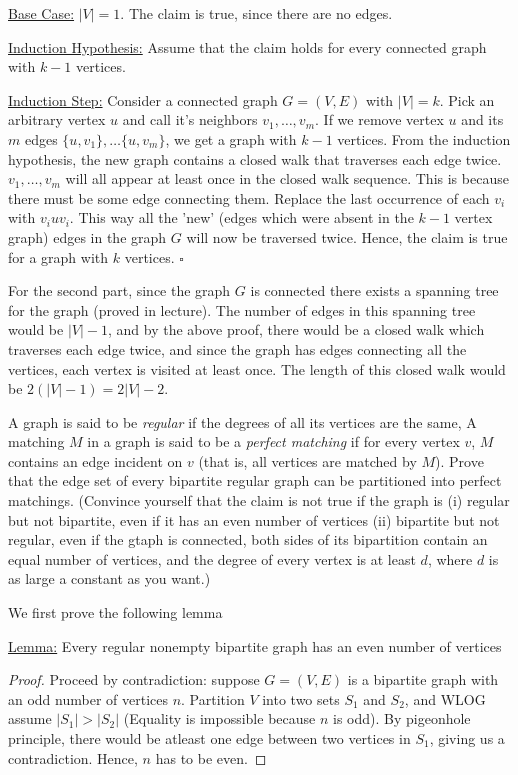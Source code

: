 \documentclass[12pt,answers]{exam}
\begin{document}
\begin{questions}
\begin{solution}
\underline{Base Case:} $|V| = 1$. The claim is true, since there are no edges.

\underline{Induction Hypothesis:} Assume that the claim holds for every connected graph with $k-1$ vertices.

\underline{Induction Step:} Consider a connected graph $G = (V,E)$ with $|V|=k$. Pick an arbitrary vertex $u$ and call it's neighbors $v_1,\ldots,v_m$. If we remove vertex $u$ and its $m$ edges $\{u,v_1 \},\ldots \{u,v_m \}$, we get a graph with $k-1$ vertices. From the induction hypothesis, the new graph contains a closed walk that traverses each edge twice. $v_1,\ldots,v_m$ will all appear at least once in the closed walk sequence. This is because there must be some edge connecting them. Replace the last occurrence of each $v_i$ with $v_i u v_i$. This way all the 'new' (edges which were absent in the $k-1$ vertex graph) edges in the graph $G$ will now be traversed twice. Hence, the claim is true for a graph with $k$ vertices. \hfill $\square$

For the second part, since the graph $G$ is connected there exists a spanning tree for the graph (proved in lecture). The number of edges in this spanning tree would be $|V|-1$, and by the above proof, there would be a closed walk which traverses each edge twice, and since the graph has edges connecting all the vertices, each vertex is visited at least once. The length of this closed walk would be $2(|V|-1) = 2|V|-2$. 
\end{solution}


\question A graph is said to be \textit{regular} if the degrees of all its vertices are the same, A matching $M$ in a graph is said to be a \textit{perfect matching} if for every vertex $v$, $M$ contains an edge incident on $v$ (that is, all vertices are matched by $M$). Prove that the edge set of every bipartite regular graph can be partitioned into perfect matchings. (Convince yourself that the claim is not true if the graph is (i) regular but not bipartite, even if it has an even number of vertices (ii) bipartite but not regular, even if the gtaph is connected, both sides of its bipartition contain an equal number of vertices, and the degree of every vertex is at least $d$, where $d$ is as large a constant as you want.)
\begin{solution} We first prove the following lemma

\underline{Lemma:} Every regular nonempty bipartite graph has an even number of vertices

\begin{proof}
Proceed by contradiction: suppose $G = (V,E)$ is a bipartite graph with an odd number of vertices $n$. Partition $V$ into two sets $S_1$ and $S_2$, and WLOG assume $|S_1| > |S_2|$ (Equality is impossible because $n$ is odd). By pigeonhole principle, there would be atleast one edge between two vertices in $S_1$, giving us a contradiction. Hence, $n$ has to be even.
\end{proof}


\end{solution}
\end{questions}
\end{document}
